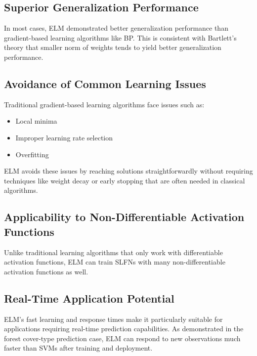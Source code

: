 \documentclass[11pt]{article}
\begin{document}
\subsection{Superior Generalization Performance}

In most cases, ELM demonstrated better generalization performance than gradient-based learning algorithms like BP. This is consistent with Bartlett's theory that smaller norm of weights tends to yield better generalization performance.

\subsection{Avoidance of Common Learning Issues}

Traditional gradient-based learning algorithms face issues such as:
\begin{itemize}
    \item Local minima
    \item Improper learning rate selection
    \item Overfitting
\end{itemize}

ELM avoids these issues by reaching solutions straightforwardly without requiring techniques like weight decay or early stopping that are often needed in classical algorithms.

\subsection{Applicability to Non-Differentiable Activation Functions}

Unlike traditional learning algorithms that only work with differentiable activation functions, ELM can train SLFNs with many non-differentiable activation functions as well.

\subsection{Real-Time Application Potential}

ELM's fast learning and response times make it particularly suitable for applications requiring real-time prediction capabilities. As demonstrated in the forest cover-type prediction case, ELM can respond to new observations much faster than SVMs after training and deployment.
\end{document}
